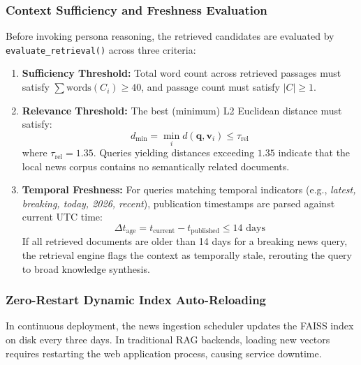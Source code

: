 \subsubsection{Context Sufficiency and Freshness Evaluation}
Before invoking persona reasoning, the retrieved candidates are evaluated by \texttt{evaluate\_retrieval()} across three criteria:
\begin{enumerate}
    \item \textbf{Sufficiency Threshold:} Total word count across retrieved passages must satisfy $\sum \text{words}(C_i) \ge 40$, and passage count must satisfy $|C| \ge 1$.
    \item \textbf{Relevance Threshold:} The best (minimum) L2 Euclidean distance must satisfy:
    \begin{equation}
    d_{\text{min}} = \min_{i} d(\mathbf{q}, \mathbf{v}_i) \le \tau_{\text{rel}}
    \end{equation}
    where $\tau_{\text{rel}} = 1.35$. Queries yielding distances exceeding $1.35$ indicate that the local news corpus contains no semantically related documents.
    \item \textbf{Temporal Freshness:} For queries matching temporal indicators (e.g., \emph{latest, breaking, today, 2026, recent}), publication timestamps are parsed against current UTC time:
    \begin{equation}
    \Delta t_{\text{age}} = t_{\text{current}} - t_{\text{published}} \le 14\text{ days}
    \end{equation}
    If all retrieved documents are older than 14 days for a breaking news query, the retrieval engine flags the context as temporally stale, rerouting the query to broad knowledge synthesis.
\end{enumerate}

\subsubsection{Zero-Restart Dynamic Index Auto-Reloading}
In continuous deployment, the news ingestion scheduler updates the FAISS index on disk every three days. In traditional RAG backends, loading new vectors requires restarting the web application process, causing service downtime. 

